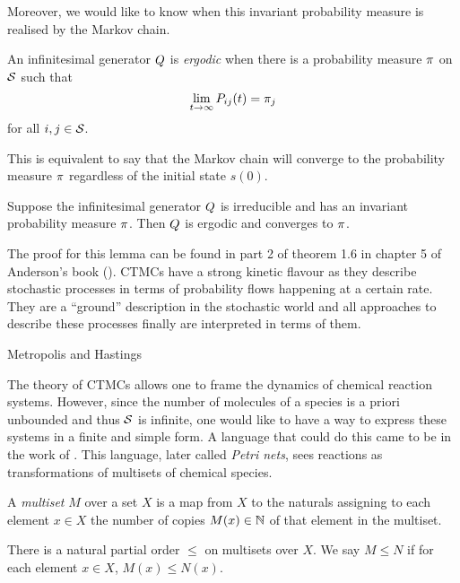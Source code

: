 Moreover, we would like to know when this invariant
probability measure is realised by the Markov chain.

\begin{definition}[ergodicity]
  An infinitesimal generator $Q$ is \emph{ergodic} when
  there is a probability measure $\pi$ on $\mathcal{S}$ such that
  \[ \lim_{t \to \infty} P_{ij}(t) = \pi_j \]
  for all $i,j \in \mathcal{S}$.
\end{definition}

This is equivalent to say that the Markov chain
will converge to the probability measure $\pi$
regardless of the initial state $s(0)$.

\begin{lemma}
  Suppose the infinitesimal generator $Q$ is irreducible
  and has an invariant probability measure $\pi$.
  Then $Q$ is ergodic and converges to $\pi$.
\end{lemma}

The proof for this lemma can be found in part 2 of theorem 1.6
in chapter 5 of Anderson's book (\cite*[][pages 160--161]{anderson}).
CTMCs have a strong kinetic flavour as they describe
stochastic processes in terms of probability flows
happening at a certain rate.
They are a ``ground'' description in the stochastic world
and all approaches to describe these processes finally
are interpreted in terms of them.

Metropolis and Hastings

The theory of CTMCs allows one to frame
the dynamics of chemical reaction systems.
However, since the number of molecules of a species
is a priori unbounded and thus $\mathcal{S}$ is infinite,
one would like to have a way to express these systems
in a finite and simple form.
A language that could do this %
came to be in the work of \citet{petri}.
This language, later called \emph{Petri nets},
sees reactions as transformations of
multisets of chemical species.

\begin{definition}
  A \emph{multiset} $M$ over a set $X$ is a map from $X$ to
  the naturals assigning to each element $x \in X$
  the number of copies $M(x) \in \mathbb{N}$ of that element
  in the multiset.
\end{definition}

There is a natural partial order $\leqslant$ on multisets over $X$.
We say $M \leqslant N$ if for each element $x \in X$,
$M(x) \leqslant N(x)$.

